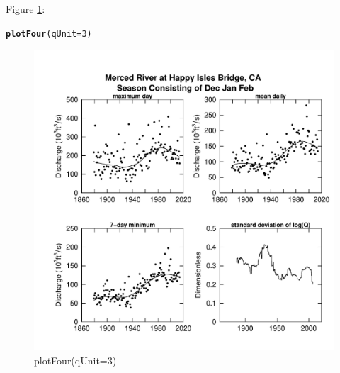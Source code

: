 \documentclass[a4paper,11pt]{article}\usepackage[]{graphicx}\usepackage[]{color}
\makeatletter
\newcommand{\hlnum}[1]{\textcolor[rgb]{0.686,0.059,0.569}{#1}}%
\newcommand{\hlstd}[1]{\textcolor[rgb]{0.345,0.345,0.345}{#1}}%
\newcommand{\hlkwc}[1]{\textcolor[rgb]{0.333,0.667,0.333}{#1}}%
\newcommand{\hlkwd}[1]{\textcolor[rgb]{0.737,0.353,0.396}{\textbf{#1}}}%
\newenvironment{kframe}{%
 \def\at@end@of@kframe{}%
 \ifinner\ifhmode%
  \def\at@end@of@kframe{\end{minipage}}%
  \begin{minipage}{\columnwidth}%
 \fi\fi%
 \def\FrameCommand##1{\hskip\@totalleftmargin \hskip-\fboxsep
 \colorbox{shadecolor}{##1}\hskip-\fboxsep
     \hskip-\linewidth \hskip-\@totalleftmargin \hskip\columnwidth}%
 \MakeFramed {\advance\hsize-\width
   \@totalleftmargin\z@ \linewidth\hsize
   \@setminipage}}%
 {\par\unskip\endMakeFramed%
 \at@end@of@kframe}
\newenvironment{knitrout}{}{} %
\makeatother
\begin{document}
Figure \ref{fig:plotFour}:
\begin{knitrout}
\color{fgcolor}\begin{kframe}
\begin{alltt}
\hlkwd{plotFour}\hlstd{(}\hlkwc{qUnit}\hlstd{=}\hlnum{3}\hlstd{)}
\end{alltt}
\end{kframe}\begin{figure}[]

\includegraphics[width=1\linewidth,height=1\linewidth]{figure/plotFour} \caption[plotFour(qUnit=3)]{plotFour(qUnit=3)\label{fig:plotFour}}
\end{figure}


\end{knitrout}
\end{document}
